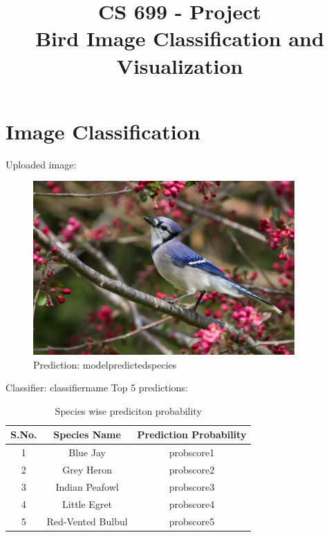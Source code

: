 \documentclass{article}
\date{}
\title{CS 699 - Project\\ Bird Image Classification and Visualization}
\begin{document}
\maketitle

\section{Image Classification}

\noindent Uploaded image:

\begin{figure}[h!]
\centering
\includegraphics[width=100mm]{bird_test}
\caption*{Prediction: modelpredictedspecies}
\label{fig:method}
\end{figure}

\noindent Classifier: classifiername
\newline
\newline
\newline
\noindent Top 5 predictions:
\newline
\begin{table}[h!]
\centering
\begin{tabular}{|c|c|c|} 
\hline
 S.No. & Species Name & Prediction Probability\\ 
\hline
 1 & Blue Jay & probscore1 \\ 
 \hline
 2 & Grey Heron & probscore2 \\  
 \hline
 3 & Indian Peafowl & probscore3 \\    
 \hline
 4 & Little Egret & probscore4 \\    
 \hline
 5 & Red-Vented Bulbul & probscore5 \\    
 \hline
\end{tabular}
\caption{Species wise prediciton probability}
\label{table:data}
\end{table}
\end{document}
